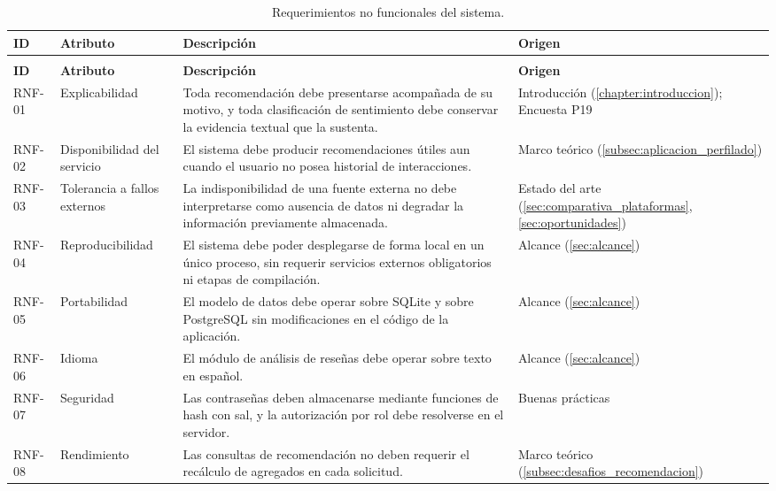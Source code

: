 \begin{longtable}{|>{\raggedright\arraybackslash}p{1.1cm}|>{\raggedright\arraybackslash}p{2cm}|>{\raggedright\arraybackslash}p{7cm}|>{\raggedright\arraybackslash}p{2.6cm}|}
	\caption{Requerimientos no funcionales del sistema.}\label{tab:rnf} \\
	\hline
	\textbf{ID} & \textbf{Atributo} & \textbf{Descripción} & \textbf{Origen} \\
	\hline
	\endfirsthead
	\multicolumn{4}{l}{\textit{Continuación de la Tabla \ref{tab:rnf}}} \\
	\hline
	\textbf{ID} & \textbf{Atributo} & \textbf{Descripción} & \textbf{Origen} \\
	\hline
	\endhead
	\hline
	\endfoot
	\hline
	\endlastfoot
	RNF-01 & Explicabilidad & Toda recomendación debe presentarse acompañada de su motivo, y toda clasificación de sentimiento debe conservar la evidencia textual que la sustenta. & Introducción (\ref{chapter:introduccion}); Encuesta P19 \\
	RNF-02 & Disponibilidad del servicio & El sistema debe producir recomendaciones útiles aun cuando el usuario no posea historial de interacciones. & Marco teórico (\ref{subsec:aplicacion_perfilado}) \\
	RNF-03 & Tolerancia a fallos externos & La indisponibilidad de una fuente externa no debe interpretarse como ausencia de datos ni degradar la información previamente almacenada. & Estado del arte (\ref{sec:comparativa_plataformas}, \ref{sec:oportunidades}) \\
	RNF-04 & Reproducibilidad & El sistema debe poder desplegarse de forma local en un único proceso, sin requerir servicios externos obligatorios ni etapas de compilación. & Alcance (\ref{sec:alcance}) \\
	RNF-05 & Portabilidad & El modelo de datos debe operar sobre SQLite y sobre PostgreSQL sin modificaciones en el código de la aplicación. & Alcance (\ref{sec:alcance}) \\
	RNF-06 & Idioma & El módulo de análisis de reseñas debe operar sobre texto en español. & Alcance (\ref{sec:alcance}) \\
	RNF-07 & Seguridad & Las contraseñas deben almacenarse mediante funciones de hash con sal, y la autorización por rol debe resolverse en el servidor. & Buenas prácticas \\
	RNF-08 & Rendimiento & Las consultas de recomendación no deben requerir el recálculo de agregados en cada solicitud. & Marco teórico (\ref{subsec:desafios_recomendacion}) \\

\end{longtable}
